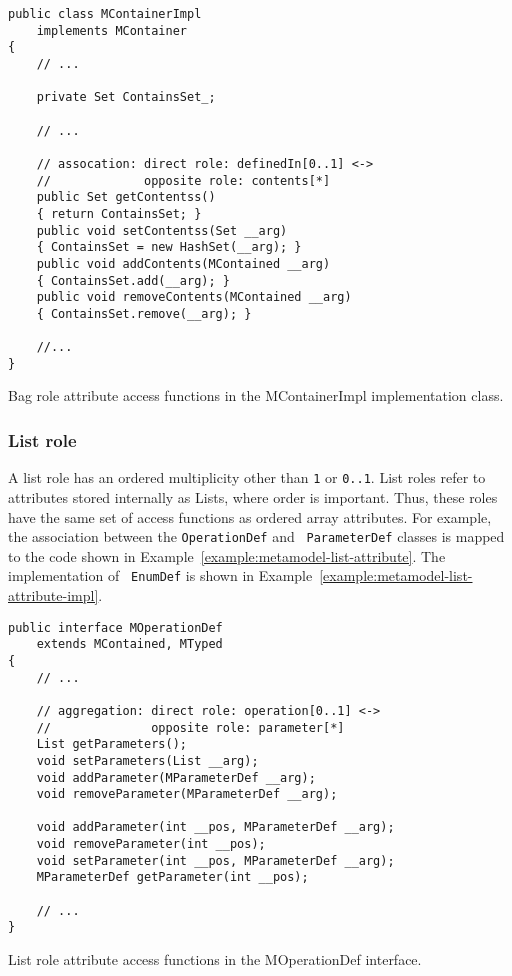 \begin{Example}
\begin{minifbox}
\begin{verbatim}
public class MContainerImpl
    implements MContainer
{
    // ...

    private Set ContainsSet_;

    // ...

    // assocation: direct role: definedIn[0..1] <->
    //             opposite role: contents[*]
    public Set getContentss()
    { return ContainsSet; }
    public void setContentss(Set __arg)
    { ContainsSet = new HashSet(__arg); }
    public void addContents(MContained __arg)
    { ContainsSet.add(__arg); }
    public void removeContents(MContained __arg)
    { ContainsSet.remove(__arg); }

    //...
}
\end{verbatim}
\end{minifbox}
\caption{Bag role attribute access functions in the MContainerImpl
implementation class.}
\label{example:metamodel-bag-attribute-impl}
\end{Example}

\subsubsection{List role}

A list role has an ordered multiplicity other than {\tt 1} or {\tt 0..1}. List
roles refer to attributes stored internally as Lists, where order is important.
Thus, these roles have the same set of access functions as ordered array
attributes. For example, the association between the {\tt OperationDef} and {\tt
ParameterDef} classes is mapped to the code shown in
Example~\ref{example:metamodel-list-attribute}. The implementation of {\tt
EnumDef} is shown in Example~\ref{example:metamodel-list-attribute-impl}.

\begin{Example}
\begin{minifbox}
\begin{verbatim}
public interface MOperationDef
    extends MContained, MTyped
{
    // ...

    // aggregation: direct role: operation[0..1] <->
    //              opposite role: parameter[*]
    List getParameters();
    void setParameters(List __arg);
    void addParameter(MParameterDef __arg);
    void removeParameter(MParameterDef __arg);

    void addParameter(int __pos, MParameterDef __arg);
    void removeParameter(int __pos);
    void setParameter(int __pos, MParameterDef __arg);
    MParameterDef getParameter(int __pos);

    // ...
}
\end{verbatim}
\end{minifbox}
\caption{List role attribute access functions in the MOperationDef interface.}
\label{example:metamodel-list-attribute}
\end{Example}

